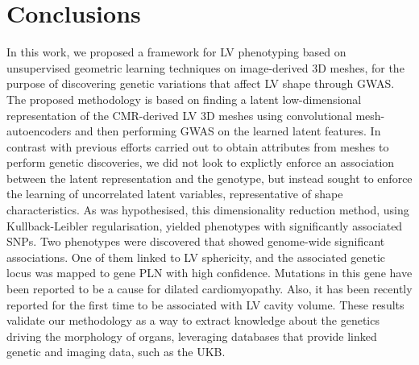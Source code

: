 \section*{Conclusions}
In this work, we proposed a framework for LV phenotyping based on unsupervised geometric learning techniques on image-derived 3D meshes, for the purpose of discovering genetic variations that affect LV shape through GWAS. The proposed methodology is based on finding a latent low-dimensional representation of the CMR-derived LV 3D meshes using convolutional mesh-autoencoders and then performing GWAS on the learned latent features. In contrast with previous efforts carried out to obtain attributes from meshes to perform genetic discoveries, we did not look to explictly enforce an association between the latent representation and the genotype, but instead sought to enforce the learning of uncorrelated latent variables, representative of shape characteristics. %
As was hypothesised, this dimensionality reduction method, using Kullback-Leibler regularisation, yielded phenotypes with significantly associated SNPs. 
Two phenotypes were discovered that showed genome-wide significant associations. One of them linked to LV sphericity, and the associated genetic locus was mapped to gene PLN with high confidence. Mutations in this gene have been reported to be a cause for dilated cardiomyopathy. Also, it has been recently reported for the first time to be associated with LV cavity volume. 
These results validate our methodology as a way to extract knowledge about the genetics driving the morphology of organs, leveraging databases that provide linked genetic and imaging data, such as the UKB.